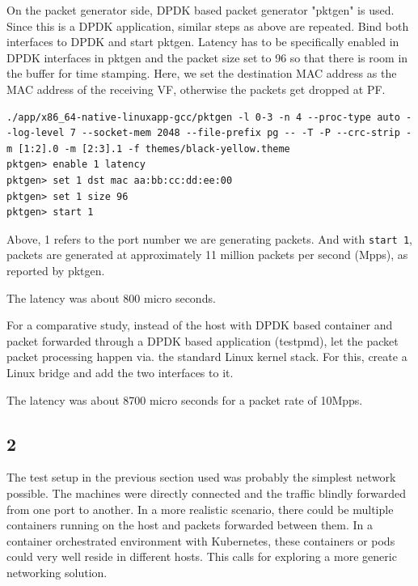 \documentclass[english, 12pt, a4paper, elec, utf8, a-1b, online]{aaltothesis}
\begin{document}
On the packet generator side, DPDK based packet generator "pktgen" is used. Since this is a DPDK application, similar steps as above are repeated. Bind both interfaces to DPDK and start pktgen.
Latency has to be specifically enabled in DPDK interfaces in pktgen and the packet size set to 96 so that there is room in the buffer for time stamping. Here, we set the destination MAC address as the MAC address of the receiving VF, otherwise the packets get dropped at PF.

\begin{lstlisting}[basicstyle={\small\ttfamily}]
./app/x86_64-native-linuxapp-gcc/pktgen -l 0-3 -n 4 --proc-type auto --log-level 7 --socket-mem 2048 --file-prefix pg -- -T -P --crc-strip -m [1:2].0 -m [2:3].1 -f themes/black-yellow.theme
pktgen> enable 1 latency
pktgen> set 1 dst mac aa:bb:cc:dd:ee:00
pktgen> set 1 size 96
pktgen> start 1
\end{lstlisting}
Above, 1 refers to the port number we are generating packets. And with \lstinline{start 1}, packets are generated at approximately 11 million packets per second (Mpps), as reported by pktgen.

The latency was about 800 micro seconds.

For a comparative study, instead of the host with DPDK based container and packet forwarded through a DPDK based application (testpmd), let the packet packet processing happen via. the standard Linux kernel stack. For this, create a Linux bridge and add the two interfaces to it.

The latency was about 8700 micro seconds for a packet rate of 10Mpps.

\subsection{2}
The test setup in the previous section used was probably the simplest network possible. The machines were directly connected and the traffic blindly forwarded from one port to another. In a more realistic scenario, there could be multiple containers running on the host and packets forwarded between them. In a container orchestrated environment with Kubernetes, these containers or pods could very well reside in different hosts. This calls for exploring a more generic networking solution.
\end{document}
